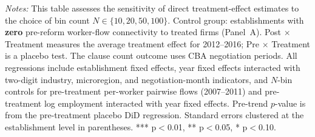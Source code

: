 \begin{table}[H]
\begin{threeparttable}
\begin{tablenotes}
\item \textit{Notes:} This table assesses the sensitivity of direct treatment-effect estimates to the choice of bin count $N \in \{10, 20, 50, 100\}$. Control group: establishments with \textbf{zero} pre-reform worker-flow connectivity to treated firms (Panel~A). Post $\times$ Treatment measures the average treatment effect for 2012--2016; Pre $\times$ Treatment is a placebo test. The clause count outcome uses CBA negotiation periods. All regressions include establishment fixed effects, year fixed effects interacted with two-digit industry, microregion, and negotiation-month indicators, and $N$-bin controls for pre-treatment per-worker pairwise flows (2007--2011) and pre-treatment log employment interacted with year fixed effects. Pre-trend $p$-value is from the pre-treatment placebo DiD regression. Standard errors clustered at the establishment level in parentheses. *** p$<$0.01, ** p$<$0.05, * p$<$0.10.
\end{tablenotes}
\end{threeparttable}
\end{table}